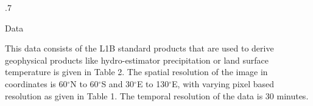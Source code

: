 \documentclass[final]{beamer}
\newlength{\colwidth}
\begin{document}
\begin{frame}[t]
\begin{columns}[t]
\begin{column}{.7\colwidth}
\begin{block}{Data}
    \begin{table}
\centering
\caption{L1B Standard Products (INSAT-3D). Used in Phase 1. }
\label{table:data:phase1}
\end{table}

    This data consists of the L1B standard products that are used to derive geophysical products like hydro-estimator precipitation or land surface temperature is given in Table 2. The spatial resolution of the image in coordinates is 60$^{\circ}$N to 60$^{\circ}$S and 30$^{\circ}$E to 130$^{\circ}$E, with varying pixel based resolution as given in Table 1. The temporal resolution of the data is 30 minutes. 


\end{block}
\end{column}
\end{columns}
\end{frame}
\end{document}
